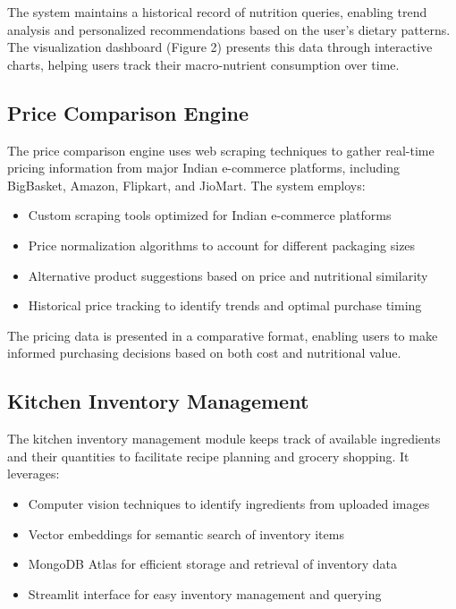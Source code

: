 \documentclass[10pt,twocolumn,letterpaper]{article}
\begin{document}
The system maintains a historical record of nutrition queries, enabling trend analysis and personalized recommendations based on the user's dietary patterns. The visualization dashboard (Figure 2) presents this data through interactive charts, helping users track their macro-nutrient consumption over time.

\subsection{Price Comparison Engine}

The price comparison engine uses web scraping techniques to gather real-time pricing information from major Indian e-commerce platforms, including BigBasket, Amazon, Flipkart, and JioMart. The system employs:

\begin{itemize}[noitemsep,topsep=0pt]
    \item Custom scraping tools optimized for Indian e-commerce platforms
    \item Price normalization algorithms to account for different packaging sizes
    \item Alternative product suggestions based on price and nutritional similarity
    \item Historical price tracking to identify trends and optimal purchase timing
\end{itemize}

The pricing data is presented in a comparative format, enabling users to make informed purchasing decisions based on both cost and nutritional value.

\subsection{Kitchen Inventory Management}

The kitchen inventory management module keeps track of available ingredients and their quantities to facilitate recipe planning and grocery shopping. It leverages:

\begin{itemize}[noitemsep,topsep=0pt]
    \item Computer vision techniques to identify ingredients from uploaded images
    \item Vector embeddings for semantic search of inventory items
    \item MongoDB Atlas for efficient storage and retrieval of inventory data
    \item Streamlit interface for easy inventory management and querying
\end{itemize}
\end{document}
